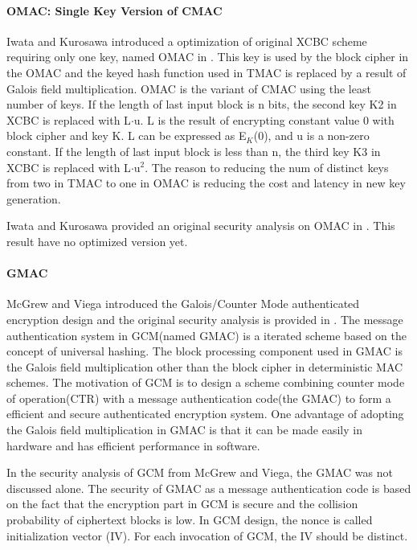 \documentclass{article}
\begin{document}
\paragraph{OMAC: Single Key Version of CMAC}
Iwata and Kurosawa introduced a optimization of original XCBC scheme requiring only one key, named OMAC in \cite{omac}. This key is used by the block cipher in the OMAC and the keyed hash function used in TMAC is replaced by a result of Galois field multiplication. OMAC is the variant of CMAC using the least number of keys. 
If the length of last input block is n bits, the second key K2 in XCBC is replaced with L$\cdot$u. L is the result of encrypting constant value 0 with block cipher and key K. L can be expressed as E$_K$(0), and u is a non-zero constant. If the length of last input block is less than n, the third key K3 in XCBC is replaced with L$\cdot$u$^2$.  
The reason to reducing the num of distinct keys from two in TMAC to one in OMAC is reducing the cost and latency in new key generation. 

Iwata and Kurosawa provided an original security analysis on OMAC in \cite{omac}. This result have no optimized version yet.


\paragraph{GMAC}
McGrew and Viega introduced the Galois/Counter Mode authenticated encryption design and the original security analysis is provided in \cite{gcm}. The message authentication system in GCM(named GMAC) is a iterated scheme based on the concept of universal hashing. The block processing component used in GMAC is the Galois field multiplication other than the block cipher in deterministic MAC schemes. 
The motivation of GCM is to design a scheme combining counter mode of operation(CTR) with a message authentication code(the GMAC) to form a efficient and secure authenticated encryption system.
One advantage of adopting the Galois field multiplication in GMAC is that it can be made easily in hardware and has efficient performance in software. 

In the security analysis of GCM from McGrew and Viega, the GMAC was not discussed alone. The security of GMAC as a message authentication code is based on the fact that the encryption part in GCM is secure and the collision probability of ciphertext blocks is low. 
In GCM design, the nonce is called initialization vector (IV). For each invocation of GCM, the IV should be distinct.
\end{document}
